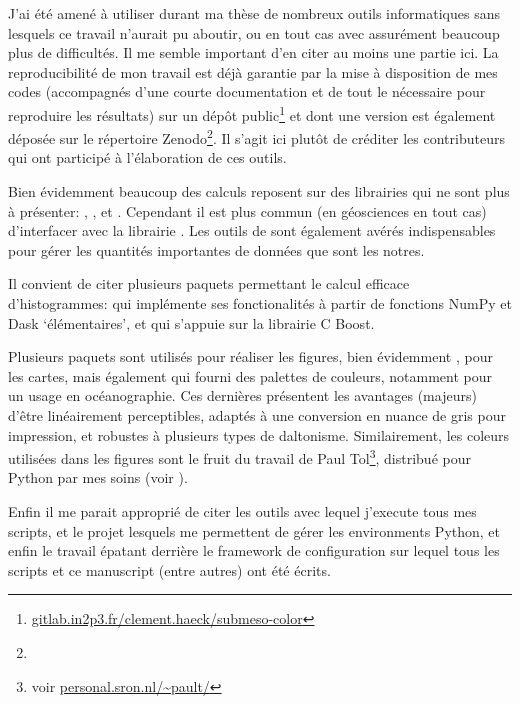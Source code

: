\documentclass[index]{subfiles}
\begin{document}
J'ai été amené à utiliser durant ma thèse de nombreux outils informatiques sans lesquels ce travail n'aurait pu aboutir, ou en tout cas avec assurément beaucoup plus de difficultés.
Il me semble important d'en citer au moins une partie ici.
La reproducibilité de mon travail est déjà garantie par la mise à disposition de mes codes (accompagnés d'une courte documentation et de tout le nécessaire pour reproduire les résultats) sur un dépôt public\footnote{%
  \url{gitlab.in2p3.fr/clement.haeck/submeso-color}
}
et dont une version est également déposée sur le répertoire Zenodo\footnote{%
}.
Il s'agit ici plutôt de créditer les contributeurs qui ont participé à l'élaboration de ces outils.

Bien évidemment beaucoup des calculs reposent sur des librairies qui ne sont plus à présenter: , , et .
Cependant il est plus commun (en géosciences en tout cas) d'interfacer avec la librairie .
Les outils de  sont également avérés indispensables pour gérer les quantités importantes de données que sont les notres.

Il convient de citer plusieurs paquets permettant le calcul efficace d'histogrammes:
 qui implémente ses fonctionalités à partir de fonctions NumPy et Dask \enquote*{élémentaires}, et
 qui s'appuie sur la librairie C Boost.

Plusieurs paquets sont utilisés pour réaliser les figures, bien évidemment ,
 pour les cartes,
mais également  qui fourni des palettes de couleurs, notamment pour un usage en océanographie. Ces dernières présentent les avantages (majeurs) d'être linéairement perceptibles, adaptés à une conversion en nuance de gris pour impression, et robustes à plusieurs types de daltonisme.
Similairement, les coleurs utilisées dans les figures sont le fruit du travail de Paul Tol\footnote{voir \url{personal.sron.nl/~pault/}}, distribué pour Python par mes soins (voir ).

Enfin il me parait approprié de citer les outils  avec lequel j'execute tous mes scripts,  et le projet  lesquels me permettent de gérer les environments Python, et enfin le travail épatant derrière le framework de configuration  sur lequel tous les scripts et ce manuscript (entre autres) ont été écrits.
\end{document}

